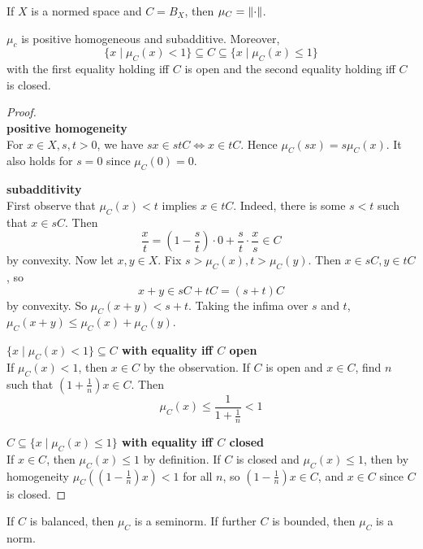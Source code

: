 \documentclass{article}
\begin{document}
\begin{eg*}
  If $X$ is a normed space and $C = B_X$, then $\mu_C = \left\lVert \cdot\right\rVert$.
\end{eg*}

\begin{lem}\label{lem:ball-gauge}
  $\mu_c$ is positive homogeneous and subadditive. Moreover,
  $$\{x \mid \mu_C(x) < 1\} \subseteq C \subseteq \{x \mid \mu_C(x) \le 1\}$$
  with the first equality holding iff $C$ is open and the second equality holding iff $C$ is closed.
\end{lem}
\begin{proof}~\\
  {\bf positive homogeneity} \\
  For $x \in X, s, t > 0$, we have $sx \in stC \iff x \in tC$. Hence
  $\mu_C(sx) = s\mu_C(x)$. It also holds for $s = 0$ since $\mu_C(0) = 0$.

  {\bf subadditivity} \\
  First observe that $\mu_C(x) < t$ implies $x \in tC$. Indeed, there is some $s < t$ such that $x \in sC$. Then
  $$\frac xt = \left(1 - \frac st\right) \cdot 0 + \frac st \cdot  \frac xs \in C$$
  by convexity. Now let $x, y \in X$. Fix $s > \mu_C(x), t > \mu_C(y)$. Then $x \in sC, y \in tC$, so
  $$x + y \in sC + tC = (s + t)C$$
  by convexity. So $\mu_C(x + y) < s + t$. Taking the infima over $s$ and $t$, $\mu_C(x + y) \le \mu_C(x) + \mu_C(y)$.

  {\bf $\{x \mid \mu_C(x) < 1\} \subseteq C$ with equality iff $C$ open} \\
  If $\mu_C(x) < 1$, then $x \in C$ by the observation. If $C$ is open and $x \in C$, find $n$ such that $\left(1 + \frac 1n\right)x \in C$. Then
  $$\mu_C(x) \le \frac 1{1 + \frac 1n} < 1$$

  {\bf $C \subseteq \{x \mid \mu_C(x) \le 1\}$ with equality iff $C$ closed} \\
  If $x \in C$, then $\mu_C(x) \le 1$ by definition. If $C$ is closed and $\mu_C(x) \le 1$, then by homogeneity $\mu_C\left(\left(1 - \frac 1n\right)x\right) < 1$ for all $n$, so $\left(1 - \frac 1n\right)x \in C$, and $x \in C$ since $C$ is closed.  
\end{proof}

\begin{rmk}
  If $C$ is balanced, then $\mu_C$ is a seminorm. If further $C$ is bounded, then $\mu_C$ is a norm.
\end{rmk}
\end{document}

